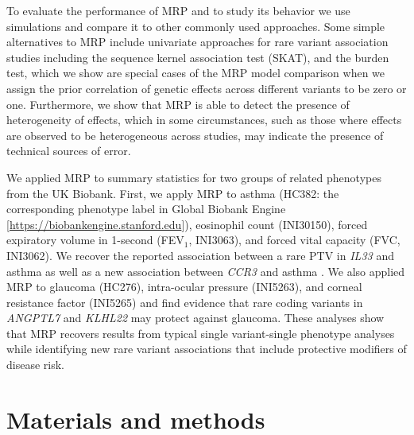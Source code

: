 To evaluate the performance of MRP and to study its behavior we use simulations and compare it to other commonly used approaches. Some simple alternatives to MRP include univariate approaches for rare variant association studies including the sequence kernel association test (SKAT)\cite{skat}, and the burden test, which we show are special cases of the MRP model comparison when we assign the prior correlation of genetic effects across different variants to be zero or one. Furthermore, we show that MRP is able to detect the presence of heterogeneity of effects, which in some circumstances, such as those where effects are observed to be heterogeneous across studies, may indicate the presence of technical sources of error. 
  
We applied MRP to summary statistics for two groups of related phenotypes from the UK Biobank. First, we apply MRP to asthma (HC382: the corresponding phenotype label in Global Biobank Engine [\url{https://biobankengine.stanford.edu}]), eosinophil count (INI30150), forced expiratory volume in 1-second (FEV$_1$, INI3063), and forced vital capacity (FVC, INI3062). We recover the reported association between a rare PTV in \textit{IL33} and asthma as well as a new association between \textit{CCR3} and asthma \cite{DeBoever179762, 10.1371/journal.pgen.1006659}. We also applied MRP to glaucoma (HC276), intra-ocular pressure (INI5263), and corneal resistance factor (INI5265) and find evidence that rare coding variants in \textit{ANGPTL7} and \textit{KLHL22} may protect against glaucoma. These analyses show that MRP recovers results from typical single variant-single phenotype analyses while identifying new rare variant associations that include protective modifiers of disease risk.

\section*{Materials and methods}

